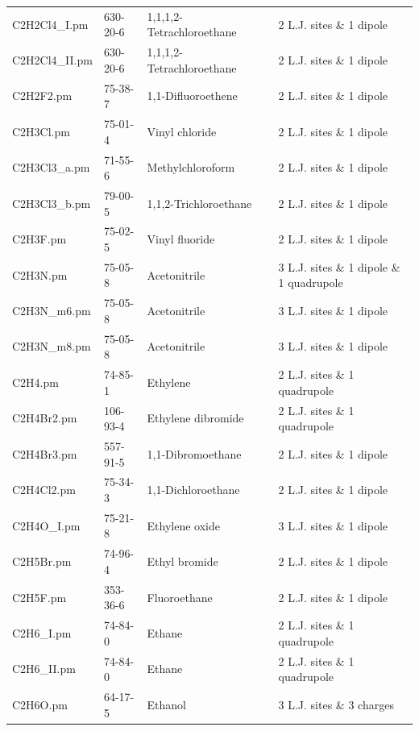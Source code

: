 \begin{landscape}
\begin{longtable}{lllll}
C2H2Cl4\_I.pm & 630-20-6 & 1,1,1,2-Tetrachloroethane & \parencite{Stoll2004} & 2 L.J. sites \& 1 dipole \\
C2H2Cl4\_II.pm & 630-20-6 & 1,1,1,2-Tetrachloroethane & \parencite{Stoll2003} & 2 L.J. sites \& 1 dipole \\
	C2H2F2.pm & 75-38-7 & 1,1-Difluoroethene & \parencite{Stoll2003} & 2 L.J. sites \& 1 dipole \\
	C2H3Cl.pm & 75-01-4 & Vinyl chloride & \parencite{Stoll2003} & 2 L.J. sites \& 1 dipole \\
	C2H3Cl3\_a.pm & 71-55-6 & Methylchloroform & \parencite{Stoll2003} & 2 L.J. sites \& 1 dipole \\
	C2H3Cl3\_b.pm & 79-00-5 & 1,1,2-Trichloroethane & \parencite{Stoll2003} & 2 L.J. sites \& 1 dipole \\
	C2H3F.pm & 75-02-5 & Vinyl fluoride & \parencite{Stoll2003} & 2 L.J. sites \& 1 dipole \\
	C2H3N.pm & 75-05-8 & Acetonitrile & \parencite{Eckl2008_C} & 3 L.J. sites \& 1 dipole \& 1 quadrupole \\
	C2H3N\_m6.pm & 75-05-8 & Acetonitrile & \parencite{Deublein2013} & 3 L.J. sites \& 1 dipole \\
	C2H3N\_m8.pm & 75-05-8 & Acetonitrile & \parencite{Deublein2013} & 3 L.J. sites \& 1 dipole \\
	C2H4.pm & 74-85-1 & Ethylene & \parencite{Vrabec2001} & 2 L.J. sites \& 1 quadrupole \\
	C2H4Br2.pm & 106-93-4 & Ethylene dibromide & \parencite{Stoll2003} & 2 L.J. sites \& 1 quadrupole \\
	C2H4Br3.pm & 557-91-5 & 1,1-Dibromoethane & \parencite{Stoll2003} & 2 L.J. sites \& 1 dipole \\
	C2H4Cl2.pm & 75-34-3 & 1,1-Dichloroethane & \parencite{Stoll2003} & 2 L.J. sites \& 1 dipole \\
	C2H4O\_I.pm & 75-21-8 & Ethylene oxide & \parencite{Eckl2008_A} & 3 L.J. sites \& 1 dipole \\
	C2H5Br.pm & 74-96-4 & Ethyl bromide & \parencite{Stoll2003} & 2 L.J. sites \& 1 dipole \\
	C2H5F.pm & 353-36-6 & Fluoroethane & \parencite{Stoll2003} & 2 L.J. sites \& 1 dipole \\
	C2H6\_I.pm & 74-84-0 & Ethane & \parencite{Vrabec2001} & 2 L.J. sites \& 1 quadrupole \\
	C2H6\_II.pm & 74-84-0 & Ethane & \parencite{Stoll2004} & 2 L.J. sites \& 1 quadrupole \\
	C2H6O.pm & 64-17-5 & Ethanol & \parencite{Schnabel2005} & 3 L.J. sites \& 3 charges \\

\end{longtable}
\end{landscape}
